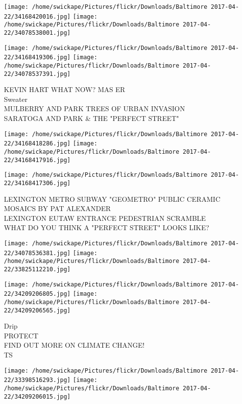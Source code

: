\documentclass[10pt,letterpaper]{article}
\begin{document}
\texttt{[image: /home/swickape/Pictures/flickr/Downloads/Baltimore 2017-04-22/34168420016.jpg]}
\texttt{[image: /home/swickape/Pictures/flickr/Downloads/Baltimore 2017-04-22/34078538001.jpg]}

\texttt{[image: /home/swickape/Pictures/flickr/Downloads/Baltimore 2017-04-22/34168419306.jpg]}
\texttt{[image: /home/swickape/Pictures/flickr/Downloads/Baltimore 2017-04-22/34078537391.jpg]}

KEVIN HART WHAT NOW?  MAS ER\\
Sweater\\
MULBERRY AND PARK TREES OF URBAN INVASION\\
SARATOGA AND PARK \& THE "PERFECT STREET"\\
\pagebreak

\texttt{[image: /home/swickape/Pictures/flickr/Downloads/Baltimore 2017-04-22/34168418286.jpg]}
\texttt{[image: /home/swickape/Pictures/flickr/Downloads/Baltimore 2017-04-22/34168417916.jpg]}

\vspace{0.25in}
\texttt{[image: /home/swickape/Pictures/flickr/Downloads/Baltimore 2017-04-22/34168417306.jpg]}

LEXINGTON METRO SUBWAY "GEOMETRO" PUBLIC CERAMIC MOSAICS BY PAT ALEXANDER\\
LEXINGTON EUTAW ENTRANCE PEDESTRIAN SCRAMBLE\\
WHAT DO YOU THINK A "PERFECT STREET" LOOKS LIKE?\\
\pagebreak

\texttt{[image: /home/swickape/Pictures/flickr/Downloads/Baltimore 2017-04-22/34078536381.jpg]}
\texttt{[image: /home/swickape/Pictures/flickr/Downloads/Baltimore 2017-04-22/33825112210.jpg]}

\texttt{[image: /home/swickape/Pictures/flickr/Downloads/Baltimore 2017-04-22/34209206805.jpg]}
\texttt{[image: /home/swickape/Pictures/flickr/Downloads/Baltimore 2017-04-22/34209206565.jpg]}

Drip\\
PROTECT\\
FIND OUT MORE ON CLIMATE CHANGE!\\
TS\\
\pagebreak

\texttt{[image: /home/swickape/Pictures/flickr/Downloads/Baltimore 2017-04-22/33398516293.jpg]}
\texttt{[image: /home/swickape/Pictures/flickr/Downloads/Baltimore 2017-04-22/34209206015.jpg]}
\end{document}

